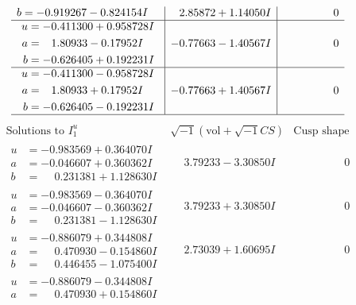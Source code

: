 \documentclass[1p]{elsarticle_modified}
\theoremstyle{definition}
\newcommand{\I}{\sqrt{-1}}
\begin{document}
$$\begin{array}{c|c|c}
\begin{aligned}
b &= -0.919267 - 0.824154 I\end{aligned}
 & \phantom{-}2.85872 + 1.14050 I & \phantom{-0.000000 } 0 \\ \hline\begin{aligned}
u &= -0.411300 + 0.958728 I \\
a &= \phantom{-}1.80933 - 0.17952 I \\
b &= -0.626405 + 0.192231 I\end{aligned}
 & -0.77663 - 1.40567 I & \phantom{-0.000000 } 0 \\ \hline\begin{aligned}
u &= -0.411300 - 0.958728 I \\
a &= \phantom{-}1.80933 + 0.17952 I \\
b &= -0.626405 - 0.192231 I\end{aligned}
 & -0.77663 + 1.40567 I & \phantom{-0.000000 } 0\\
 \hline 
 \end{array}$$\newpage$$\begin{array}{c|c|c}  
\text{Solutions to }I^u_{1}& \I (\text{vol} + \sqrt{-1}CS) & \text{Cusp shape}\\
 \hline 
\begin{aligned}
u &= -0.983569 + 0.364070 I \\
a &= -0.046607 + 0.360362 I \\
b &= \phantom{-}0.231381 + 1.128630 I\end{aligned}
 & \phantom{-}3.79233 - 3.30850 I & \phantom{-0.000000 } 0 \\ \hline\begin{aligned}
u &= -0.983569 - 0.364070 I \\
a &= -0.046607 - 0.360362 I \\
b &= \phantom{-}0.231381 - 1.128630 I\end{aligned}
 & \phantom{-}3.79233 + 3.30850 I & \phantom{-0.000000 } 0 \\ \hline\begin{aligned}
u &= -0.886079 + 0.344808 I \\
a &= \phantom{-}0.470930 - 0.154860 I \\
b &= \phantom{-}0.446455 - 1.075400 I\end{aligned}
 & \phantom{-}2.73039 + 1.60695 I & \phantom{-0.000000 } 0 \\ \hline\begin{aligned}
u &= -0.886079 - 0.344808 I \\
a &= \phantom{-}0.470930 + 0.154860 I \\

\end{aligned}
\end{array}$$
\end{document}
